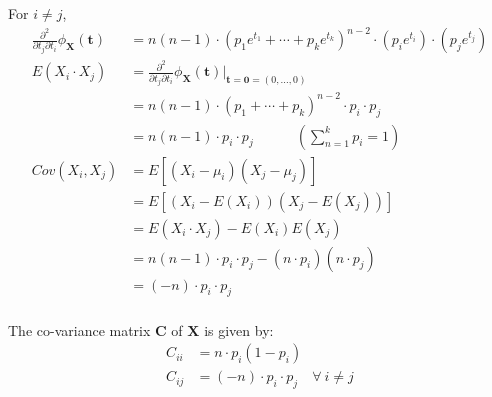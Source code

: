 \documentclass[11pt, fleqn]{article}
\begin{document}
For $i \ne j$,
\begin{equation*}
    \begin{split}
        \frac{\partial^2}{\partial t_j \partial t_i} \phi_{\mathbf{X}}(\mathbf{t}) &= n(n-1) \cdot (p_1 e^{t_1} + \cdots + p_k e^{t_k})^{n-2} \cdot (p_i e^{t_i}) \cdot (p_j e^{t_j}) \\
        E(X_i \cdot X_j) &= \frac{\partial^2}{\partial t_j \partial t_i} \phi_{\mathbf{X}}(\mathbf{t}) \bigg\rvert_{\mathbf{t} = \mathbf{0} = (0, \dots, 0)} \\
            &= n(n-1) \cdot (p_1 + \cdots + p_k)^{n-2} \cdot p_i \cdot p_j \\
            &= n(n-1) \cdot p_i  \cdot p_j \hspace{3em} (\sum_{n=1}^{k} p_i = 1) \\
        Cov(X_i, X_j) &= E[(X_i - \mu_i)(X_j - \mu_j)] \\
            &= E[(X_i - E(X_i))(X_j - E(X_j))] \\
            &= E(X_i \cdot X_j) - E(X_i)E(X_j) \\
            &= n(n-1) \cdot p_i  \cdot p_j - (n \cdot p_i)(n \cdot p_j) \\
            &= (-n) \cdot p_i \cdot p_j  \\
    \end{split}
\end{equation*}

The co-variance matrix $\mathbf{C}$ of $\mathbf{X}$ is given by:
\begin{equation*}
    \begin{split}
        C_{ii} &= n \cdot p_i (1 - p_i) \\
        C_{ij} &= (-n) \cdot p_i \cdot p_j \quad \forall \ i \ne j \\
    \end{split}
\end{equation*}
\end{document}
